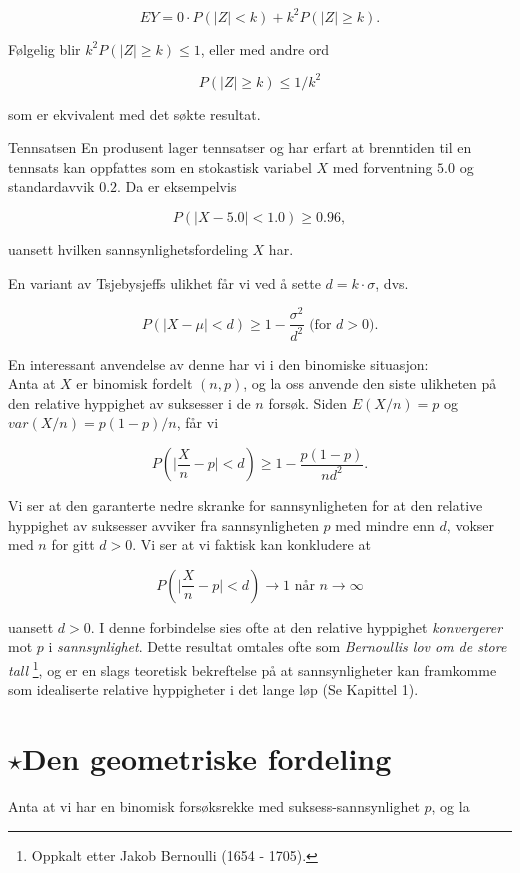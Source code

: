 \[ EY=0 \cdot P(\mid Z \mid < k)+k^2 P( \mid Z \mid \geq k). \]

\noindent Følgelig blir $k^2 P( \mid Z \mid \geq k) \leq 1$,
 eller med andre ord

\[     P(\mid Z \mid \geq k) \leq 1/k^2 \]

\noindent som er ekvivalent med det søkte resultat.\\
\normalsize

\begin{eksempel}{Tennsatsen}
En produsent lager tennsatser og har erfart at brenntiden til en
tennsats kan oppfattes som en stokastisk variabel $X$ med
forventning $5.0$ og standardavvik $0.2$. Da er eksempelvis

\[ P( \mid X-5.0 \mid < 1.0) \geq 0.96, \]

\noindent uansett hvilken sannsynlighetsfordeling $X$ har.
\end{eksempel}

En variant av Tsjebysjeffs ulikhet får vi ved å
sette $d=k \cdot \sigma$, dvs.

\[P( \mid X-\mu \mid < d)\geq 1-\frac{{\sigma}^2}{d^2}\mbox{\ \ (for $d>0$).}\]

\noindent En interessant anvendelse av denne har vi i den binomiske situasjon:\\

Anta at $X$ er binomisk fordelt $(n,p)$, og la oss anvende den
siste ulikheten på den relative hyppighet av suksesser i de $n$
forsøk. Siden $E(X/n)=p$ og $var(X/n)=p(1-p)/n$, får vi

\[ P(\mid \frac{X}{n}-p \mid < d) \geq 1- \frac{p(1-p)}{nd^2} . \]

\noindent Vi ser at den garanterte nedre skranke for sannsynligheten for at
den relative hyppighet av suksesser avviker fra sannsynligheten
$p$ med mindre enn $d$, vokser med $n$ for gitt $d>0$. Vi ser at
vi faktisk kan konkludere at 

\[ P(\mid \frac{X}{n}-p \mid < d) \rightarrow 1 \mbox{\ \ når \ }
                 n \rightarrow \infty \]

\noindent uansett $d>0$. I denne forbindelse sies ofte at den relative
hyppighet {\em konvergerer} mot $p$ i {\em sannsynlighet}. Dette
resultat omtales ofte som {\em Bernoullis lov om de store tall}
\footnote{Oppkalt etter Jakob Bernoulli (1654 - 1705).}, og er
en slags teoretisk bekreftelse på at sannsynligheter kan framkomme som
idealiserte relative hyppigheter i det lange løp (Se Kapittel 1).


\section{$\star$Den geometriske fordeling}
\small
Anta at vi har en binomisk forsøksrekke med suksess-sannsynlighet
$p$, og la

